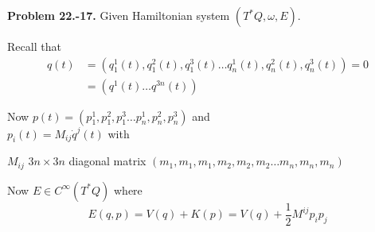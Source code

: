 \documentclass[11pt]{amsart}
\theoremstyle{definition}
\newcommand{\problemhead}[1]{\medskip\noindent\textbf{Problem #1.} }
\begin{document}
\problemhead{22.-17} Given Hamiltonian system $(T^*Q, \omega,E)$.

Recall that
\[
\begin{aligned}
  q(t) & = (q_1^1(t),q_1^2(t), q_1^3(t) \dots q^1_n(t),q_n^2(t),q_n^3(t))=0 \\
  & = (q^1(t) \dots q^{3n}(t))
\end{aligned}
\]

Now $p(t) = (p_1^1,p_1^2,p_1^3\dots p_n^1,p_n^2,p_n^3)$ and \\
$p_i(t)=M_{ij}\dot{q}^j(t)$ with

$M_{ij}$ $3n \times 3n$ diagonal matrix $(m_1,m_1,m_1,m_2,m_2,m_2 \dots m_n, m_n, m_n)$

Now $E \in C^{\infty}(T^*Q)$ where
\[
E(q,p) = V(q) + K(p) = V(q) + \frac{1}{2} M^{ij}p_i p_j
\]
\end{document}
